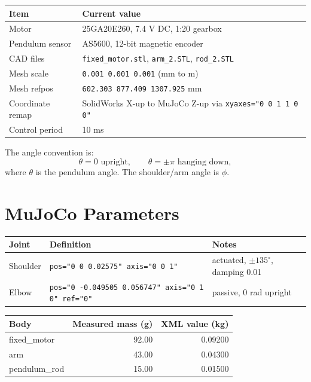 \documentclass[11pt,a4paper]{article}
\begin{document}
\begin{center}
\begin{tabular}{ll}
\toprule
\textbf{Item} & \textbf{Current value} \\
\midrule
Motor & 25GA20E260, 7.4 V DC, 1:20 gearbox \\
Pendulum sensor & AS5600, 12-bit magnetic encoder \\
CAD files & \texttt{fixed\_motor.stl}, \texttt{arm\_2.STL}, \texttt{rod\_2.STL} \\
Mesh scale & \texttt{0.001 0.001 0.001} (mm to m) \\
Mesh refpos & \texttt{602.303 877.409 1307.925} mm \\
Coordinate remap & SolidWorks X-up to MuJoCo Z-up via \texttt{xyaxes="0 0 1 1 0 0"} \\
Control period & 10 ms \\
\bottomrule
\end{tabular}
\end{center}

The angle convention is:
\[
\theta=0 \text{ upright}, \qquad \theta=\pm\pi \text{ hanging down},
\]
where $\theta$ is the pendulum angle.  The shoulder/arm angle is $\phi$.

\section{MuJoCo Parameters}

\begin{center}
\begin{tabular}{lll}
\toprule
\textbf{Joint} & \textbf{Definition} & \textbf{Notes} \\
\midrule
Shoulder & \texttt{pos="0 0 0.02575" axis="0 0 1"} & actuated, $\pm135^\circ$, damping 0.01 \\
Elbow & \texttt{pos="0 -0.049505 0.056747" axis="0 1 0" ref="0"} & passive, $0$ rad upright \\
\bottomrule
\end{tabular}
\end{center}

\begin{center}
\begin{tabular}{lrr}
\toprule
\textbf{Body} & \textbf{Measured mass (g)} & \textbf{XML value (kg)} \\
\midrule
fixed\_motor & 92.00 & 0.09200 \\
arm & 43.00 & 0.04300 \\
pendulum\_rod & 15.00 & 0.01500 \\
\bottomrule
\end{tabular}
\end{center}
\end{document}

